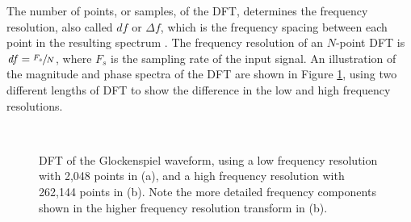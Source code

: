 \documentclass[report.tex]{subfiles}
\begin{document}
The number of points, or samples, of the DFT, determines the frequency resolution, also called $\mathit{df}$ or $\mathit{\Delta f}$, which is the frequency spacing between each point in the resulting spectrum \parencite{discretebook}. The frequency resolution of an $N$-point DFT is $\mathit{df} = \sfrac{F_{s}}{N}$, where $F_{s}$ is the sampling rate of the input signal. An illustration of the magnitude and phase spectra of the DFT are shown in Figure \ref{fig:glockdft}, using two different lengths of DFT to show the difference in the low and high frequency resolutions.

\begin{figure}[ht]
	\centering
	\\
	\caption{DFT of the Glockenspiel waveform, using a low frequency resolution with 2,048 points in (a), and a high frequency resolution with 262,144 points in (b). Note the more detailed frequency components shown in the higher frequency resolution transform in (b).}
	\label{fig:glockdft}
\end{figure}
\end{document}
